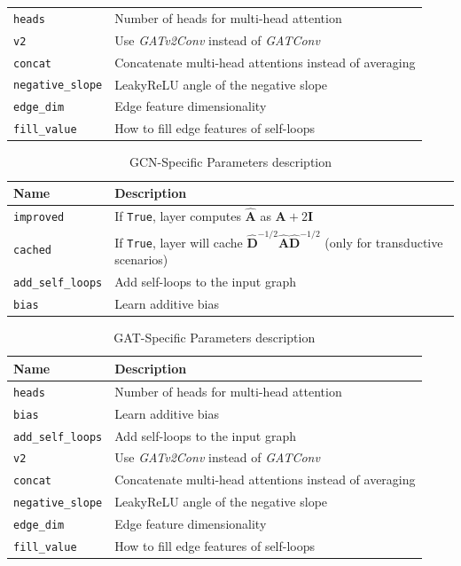 \begin{table}[ht!]
\begin{tabular}{lp{8cm}}
		\texttt{heads} & Number of heads for multi-head attention \\
		\texttt{v2} & Use \textit{GATv2Conv} instead of \textit{GATConv} \\
		\texttt{concat} & Concatenate multi-head attentions instead of averaging \\
		\texttt{negative\_slope} & LeakyReLU angle of the negative slope \\
		\texttt{edge\_dim} & Edge feature dimensionality \\
		\texttt{fill\_value} & How to fill edge features of self-loops \\
		\bottomrule
	\end{tabular}
	\label{tab:gnn-params}
\end{table}

\begin{table}[ht!]
	\centering
	\caption{\ac{GCN}-Specific Parameters description}
	\begin{tabular}{lp{8cm}}
		\toprule
		\textbf{Name} & \textbf{Description} \\
		\midrule
		\texttt{improved} & If \texttt{True}, layer computes $\mathbf{\hat{A}}$ as $\mathbf{A} + 2\mathbf{I}$ \\
		\texttt{cached} & If \texttt{True}, layer will cache $\mathbf{\hat{D}}^{-1/2} \mathbf{\hat{A}} \mathbf{\hat{D}}^{-1/2}$ (only for transductive scenarios) \\
		\texttt{add\_self\_loops} & Add self-loops to the input graph \\
		\texttt{bias} & Learn additive bias \\
		\bottomrule
	\end{tabular}
	\label{tab:gcn-params}
\end{table}

\begin{table}[ht!]
	\centering
	\caption{\ac{GAT}-Specific Parameters description}
	\begin{tabular}{lp{8cm}}
		\toprule
		\textbf{Name} & \textbf{Description} \\
		\midrule
				
		\texttt{heads} & Number of heads for multi-head attention \\
		\texttt{bias} & Learn additive bias \\
		\texttt{add\_self\_loops} & Add self-loops to the input graph \\
		\texttt{v2} & Use \textit{GATv2Conv} instead of \textit{GATConv} \\
		\texttt{concat} & Concatenate multi-head attentions instead of averaging \\
		\texttt{negative\_slope} & LeakyReLU angle of the negative slope \\
		\texttt{edge\_dim} & Edge feature dimensionality \\
		\texttt{fill\_value} & How to fill edge features of self-loops \\
		\bottomrule
	\end{tabular}
	\label{tab:gat-params}
\end{table}


